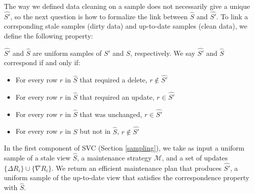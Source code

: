The way we defined data cleaning on a sample does not necessarily give a unique $\hat{S'}$, so the next question is how to formalize the link between $\hat{S}$ and $\hat{S'}$. 
To link a corrsponding stale samples (dirty data) and up-to-date samples (clean data), we define the following property:
\begin{definition}[Correspondence]
$\hat{S'}$ and $\hat{S}$ are uniform samples of $S'$ and $S$, respectively.  We say $\hat{S'}$ and $\hat{S}$ correspond if and only if:
\begin{itemize}[noitemsep]
\item For every row $r$ in $\hat{S}$ that required a delete, $r \not\in \hat{S'}$
\item For every row $r$ in $\hat{S}$ that required an update, $r\in \hat{S'}$
\item For every row $r$ in $\hat{S}$  that was unchanged, $r \in \hat{S'}$
\item For every row $r$ in $S$ but not in $\hat{S}$, $r \not\in \hat{S'}$
\end{itemize}
\label{correspondence}
\end{definition}

In the first component of SVC (Section \ref{sampling}), we take as input a uniform sample of a stale view $\hat{S}$, a maintenance strategy $\mathcal{M}$, and a set of updates $\{\Delta R_i\} \cup \{\nabla R_i\}$.
We return an efficient maintenance plan that produces $\hat{S'}$, a uniform sample of the up-to-date view that satisfies the correspondence property with $\hat{S}$.

